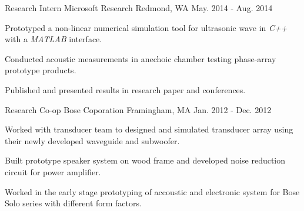 \begin{cventries}
	\cventry
		{Research Intern} %
		{Microsoft Research} %
		{Redmond, WA} %
		{May. 2014 - Aug. 2014} %
		{
			\begin{cvitems} %
				\item {Prototyped a non-linear numerical simulation tool for ultrasonic wave in %
				\textit{C++} with a \textit{MATLAB} interface.}
				\item {Conducted acoustic measurements in anechoic chamber testing phase-array %
				prototype products.}
				\item {Published and presented results in research paper and conferences.}
			\end{cvitems}
		}

	\cventry
		{Research Co-op} %
		{Bose Coporation} %
		{Framingham, MA} %
		{Jan. 2012 - Dec. 2012} %
		{
			\begin{cvitems} %
				\item {Worked with transducer team to designed and simulated transducer array %
				using their newly developed waveguide and subwoofer.}
				\item {Built prototype speaker system on wood frame and developed noise %
				reduction circuit for power amplifier.}
				\item {Worked in the early stage prototyping of accoustic and electronic system %
				for Bose Solo series with different form factors.}
			\end{cvitems}
		}


\end{cventries}
